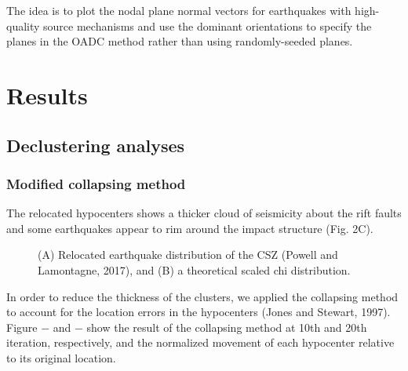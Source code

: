 \documentclass[draft]{agujournal2018}
\begin{document}
The idea is to plot the nodal plane normal vectors for earthquakes with high-quality source mechanisms and use the dominant orientations to specify the planes in the OADC method rather than using randomly-seeded planes. 







\section{Results}

\subsection{Declustering analyses}

\subsubsection{Modified collapsing method}
The relocated hypocenters shows a thicker cloud of seismicity about the rift faults and some earthquakes appear to rim around the impact structure (Fig. 2C).

\begin{figure}[ht]
\centering
\caption{(A) Relocated earthquake distribution of the CSZ (Powell and Lamontagne, 2017), and (B) a theoretical scaled chi distribution.}
\label{figfour}
\end{figure} 

In order to reduce the thickness of the clusters, we applied the collapsing method to account for the location errors in the hypocenters (Jones and Stewart, 1997). Figure $-$ and $-$ show the result of the collapsing method at 10th and 20th iteration, respectively, and the normalized movement of each hypocenter relative to its original location. 
\end{document}
